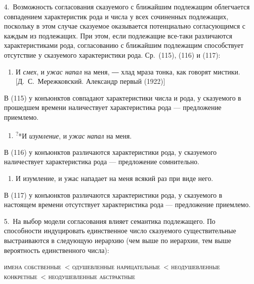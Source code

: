 4.~Возможность согласования сказуемого с ближайшим подлежащим
облегчается совпадением характеристик рода и числа у всех сочиненных
подлежащих, поскольку в этом случае сказуемое оказывается потенциально
согласующимся с каждым из подлежащих. При этом, если подлежащие все-таки
различаются характеристиками рода, согласованию с ближайшим подлежащим
способствует отсутствие у сказуемого характеристики рода. Ср.~(115),
(116) и (117):

\begin{enumerate}
  \def\labelenumi{(\arabic{enumi})}
  \setcounter{enumi}{114}
  \item
        И \textit{смех}, и \textit{ужас напал} на меня, ― хлад мраза тонка, как
        говорят мистики. {[}Д.~С.~Мережковский. Александр первый (1922){]}
\end{enumerate}

В (115) у конъюнктов совпадают характеристики числа и рода, у сказуемого
в прошедшем времени наличествует характеристика рода --- предложение
приемлемо.

\begin{enumerate}
  \def\labelenumi{(\arabic{enumi})}
  \setcounter{enumi}{115}
  \item
        \textsuperscript{?}*И \textit{изумление}, и \textit{ужас} \textit{напал} на
        меня.
\end{enumerate}

В (116) у конъюнктов различаются характеристики рода, у сказуемого
наличествует характеристика рода --- предложение сомнительно.

\begin{enumerate}
  \def\labelenumi{(\arabic{enumi})}
  \setcounter{enumi}{116}
  \item
        И изумление, и ужас нападает на меня всякий раз при виде него.
\end{enumerate}

В (117) у конъюнктов различаются характеристики рода, у сказуемого в
настоящем времени отсутствует характеристика рода --- предложение
приемлемо.

5.~На выбор модели согласования влияет семантика подлежащего. По
способности индуцировать единственное число сказуемого существительные
выстраиваются в следующую иерархию (чем выше по иерархии, тем выше
вероятность единственного числа):

\textsc{имена собственные~\textless{} одушевленные
  нарицательные~\textless{} неодушевленные конкретные~\textless{}
  неодушевленные абстрактные}


